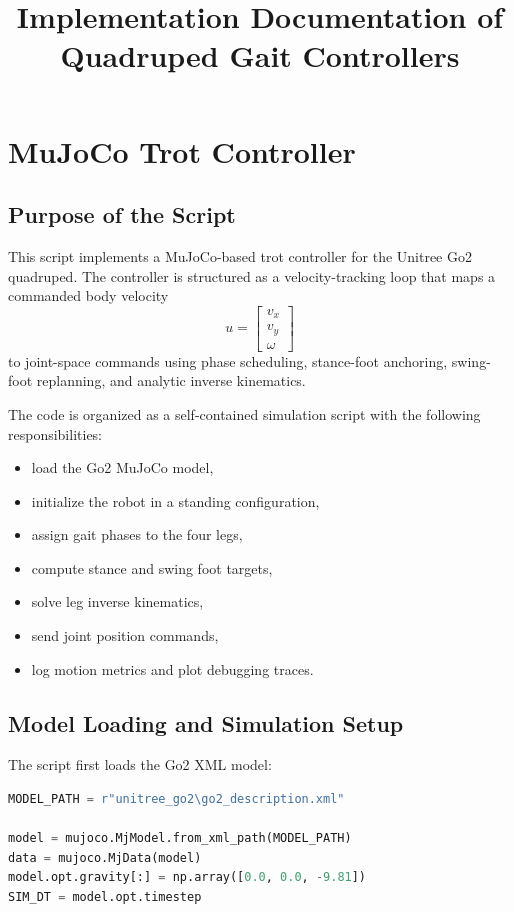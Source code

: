 \documentclass[11pt,a4paper]{report}
\title{Implementation Documentation of Quadruped Gait Controllers}
\author{}
\date{}
\begin{document}
\maketitle
\setcounter{tocdepth}{0}
\tableofcontents

\chapter{MuJoCo Trot Controller}

\section{Purpose of the Script}

This script implements a MuJoCo-based trot controller for the Unitree Go2 quadruped. The controller is structured as a velocity-tracking loop that maps a commanded body velocity
\[
u =
\begin{bmatrix}
v_x \\
v_y \\
\omega
\end{bmatrix}
\]
to joint-space commands using phase scheduling, stance-foot anchoring, swing-foot replanning, and analytic inverse kinematics.

The code is organized as a self-contained simulation script with the following responsibilities:
\begin{itemize}
    \item load the Go2 MuJoCo model,
    \item initialize the robot in a standing configuration,
    \item assign gait phases to the four legs,
    \item compute stance and swing foot targets,
    \item solve leg inverse kinematics,
    \item send joint position commands,
    \item log motion metrics and plot debugging traces.
\end{itemize}

\section{Model Loading and Simulation Setup}

The script first loads the Go2 XML model:
\begin{lstlisting}[language=Python]
MODEL_PATH = r"unitree_go2\go2_description.xml"

model = mujoco.MjModel.from_xml_path(MODEL_PATH)
data = mujoco.MjData(model)
model.opt.gravity[:] = np.array([0.0, 0.0, -9.81])
SIM_DT = model.opt.timestep
\end{lstlisting}
\end{document}
